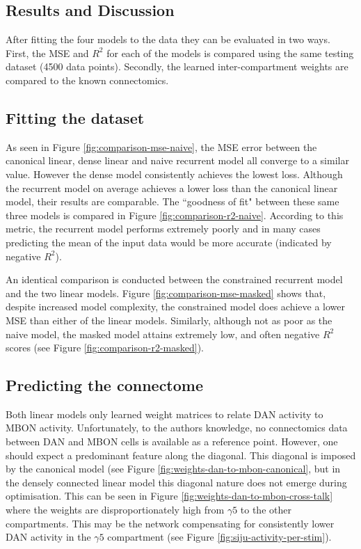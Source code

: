 \documentclass[11pt, A4]{article}
\begin{document}
\begin{multicols}{2}
\section{Results and Discussion}

After fitting the four models to the data they can be evaluated in two ways. First, the MSE and $R^2$ for each of the models is compared using the same testing dataset (4500 data points). Secondly, the learned inter-compartment weights are compared to the known connectomics.

\subsection{Fitting the dataset}
As seen in Figure \ref{fig:comparison-mse-naive}, the MSE error between the canonical linear, dense linear and naive recurrent model all converge to a similar value. However the dense model consistently achieves the lowest loss. Although the recurrent model on average achieves a lower loss than the canonical linear model, their results are comparable. The ``goodness of fit" between these same three models is compared in Figure \ref{fig:comparison-r2-naive}. According to this metric, the recurrent model performs extremely poorly and in many cases predicting the mean of the input data would be more accurate (indicated by negative $R^2$). 

An identical comparison is conducted between the constrained recurrent model and the two linear models. Figure \ref{fig:comparison-mse-masked} shows that, despite increased model complexity, the constrained model does achieve a lower MSE than either of the linear models. Similarly, although not as poor as the naive model, the masked model attains extremely low, and often negative $R^2$ scores (see Figure  \ref{fig:comparison-r2-masked}).

\subsection{Predicting the connectome}
Both linear models only learned weight matrices to relate DAN activity to MBON activity. Unfortunately, to the authors knowledge, no connectomics data between DAN and MBON cells is available as a reference point. However, one should expect a predominant feature along the diagonal. This diagonal is imposed by the canonical model (see Figure \ref{fig:weights-dan-to-mbon-canonical}, but in the densely connected linear model this diagonal nature does not emerge during optimisation. This can be seen in  Figure \ref{fig:weights-dan-to-mbon-cross-talk} where the weights are disproportionately high from $\gamma 5$ to the other compartments. This may be the network compensating for consistently lower DAN activity in the $\gamma 5$ compartment (see Figure \ref{fig:siju-activity-per-stim}). 


\end{multicols}
\end{document}
